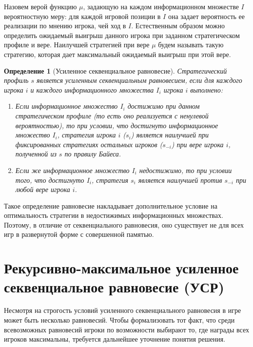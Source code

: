\documentclass[14pt, a4paper]{extreport}
\newtheorem{definition}{\indent Определение}
\begin{document}
        Назовем верой функцию $\mu$, задающую на каждом информационном множестве $I$ вероятностную меру: для каждой игровой позиции в $I$ она задает вероятность ее реализации по мнению игрока, чей ход в $I$. Естественным образом можно определить ожидаемый выигрыш данного игрока при заданном стратегическом профиле и вере. Наилучшей стратегией при вере $\mu$ будем называть такую стратегию, которая дает максимальный ожидаемый выигрыш при этой вере.
        \begin{definition}[Усиленное секвенциальное равновесие]
            Стратегический профиль $s$ является усиленным секвенциальным равновесием, если для каждого игрока $i$ и каждого информационного множества $I_i$ игрока $i$ выполнено:

            \begin{enumerate}
                \item Если информационное множество $I_i$ достижимо при данном стратегическом профиле (то есть оно реализуется с ненулевой вероятностью), то при условии, что достигнуто информационное множество $I_i$, стратегия игрока $i$ ($s_i$) является наилучшей при фиксированных стратегиях остальных игроков ($s_{-i}$) при вере игрока $i$, полученной из $s$ по правилу Байеса.
                \item Если же информационное множество $I_i$ недостижимо, то при условии того, что достигнуто $I_i$, стратегия $s_i$ является наилучшей против $s_{-i}$ при любой вере игрока $i$.
            \end{enumerate}
        \end{definition}

        Такое определение равновесие накладывает дополнительное условие на оптимальность стратегии в недостижимых информационных множествах. Поэтому, в отличие от секвенциального равновесия, оно существует не для всех игр в развернутой форме с совершенной памятью.

        \section{Рекурсивно-максимальное усиленное секвенциальное равновесие (УСР)}

        Несмотря на строгость условий усиленного секвенциального равновесия в игре может быть несколько равновесий. Чтобы формализовать тот факт, что среди всевозможных равновесий игроки по возможности выбирают то, где награды всех игроков максимальны, требуется дальнейшее уточнение понятия решения.
\end{document}
